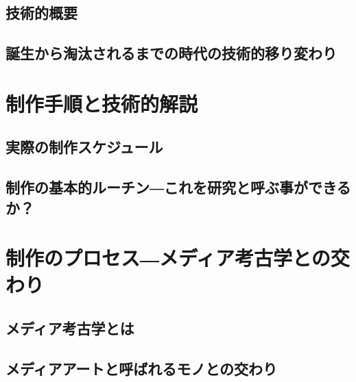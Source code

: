 \section{技術的概要}\label{ux6280ux8853ux7684ux6982ux8981}

\section{誕生から淘汰されるまでの時代の技術的移り変わり}\label{ux8a95ux751fux304bux3089ux6dd8ux6c70ux3055ux308cux308bux307eux3067ux306eux6642ux4ee3ux306eux6280ux8853ux7684ux79fbux308aux5909ux308fux308a}

\chapter{制作手順と技術的解説}\label{ux5236ux4f5cux624bux9806ux3068ux6280ux8853ux7684ux89e3ux8aac}

\section{実際の制作スケジュール}\label{ux5b9fux969bux306eux5236ux4f5cux30b9ux30b1ux30b8ux30e5ux30fcux30eb}

\section{制作の基本的ルーチン―これを研究と呼ぶ事ができるか？}\label{ux5236ux4f5cux306eux57faux672cux7684ux30ebux30fcux30c1ux30f3ux3053ux308cux3092ux7814ux7a76ux3068ux547cux3076ux4e8bux304cux3067ux304dux308bux304b}

\chapter{制作のプロセス―メディア考古学との交わり}\label{ux5236ux4f5cux306eux30d7ux30edux30bbux30b9ux30e1ux30c7ux30a3ux30a2ux8003ux53e4ux5b66ux3068ux306eux4ea4ux308fux308a}

\section{メディア考古学とは}\label{ux30e1ux30c7ux30a3ux30a2ux8003ux53e4ux5b66ux3068ux306f}

\section{メディアアートと呼ばれるモノとの交わり}\label{ux30e1ux30c7ux30a3ux30a2ux30a2ux30fcux30c8ux3068ux547cux3070ux308cux308bux30e2ux30ceux3068ux306eux4ea4ux308fux308a}

